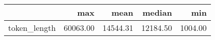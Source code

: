\begin{tabular}{lrrrr}
\toprule
 & max & mean & median & min \\
\midrule
token\_length & 60063.00 & 14544.31 & 12184.50 & 1004.00 \\
\bottomrule
\end{tabular}
